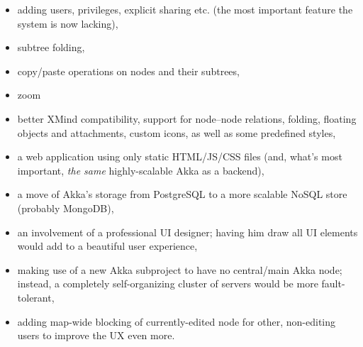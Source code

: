 \begin{itemize}
	\item adding users, privileges, explicit sharing etc. (the most important feature the system is now lacking),
	\item subtree folding,
	\item copy/paste operations on nodes and their subtrees,
	\item zoom 
	\item better XMind compatibility, support for node--node relations, folding, floating objects and attachments, custom icons, as well as some predefined styles,
	\item a web application using only static HTML/JS/CSS files (and, what's most important, \emph{the same} highly-scalable Akka as a backend),
	\item a move of Akka's storage from PostgreSQL to a more scalable NoSQL store (probably MongoDB),
	\item an involvement of a professional UI designer; having him draw all UI elements would add to a beautiful user experience,
	\item making use of a new  Akka subproject to have no central/main Akka node; instead, a completely self-organizing cluster of servers would be more fault-tolerant,
	\item adding map-wide blocking of currently-edited node for other, non-editing users to improve the UX even more.
\end{itemize}
